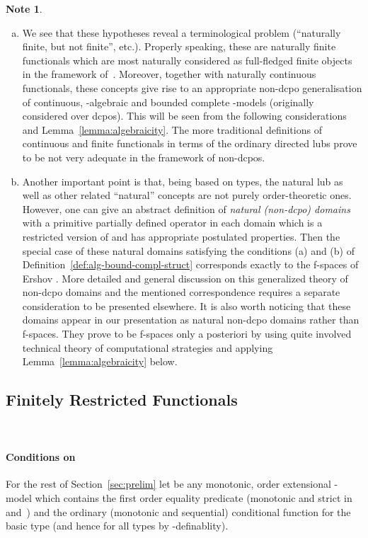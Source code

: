\documentclass[fleqn]{LMCS}
\theoremstyle{plain}\newtheorem{satz}[thm]{Satz}
\theoremstyle{plain}\newtheorem{hyp}[thm]{Hypothesis}
\theoremstyle{plain}\newtheorem{hyps}[thm]{Hypotheses}
\theoremstyle{definition}\newtheorem{note}[thm]{Note}
\newcommand{\fo}{f}
\newcommand{\pointwiselub}{\biguplus}
\newcommand{\fla}[1]{}
\newcommand{\?}{\mbox{?}}
\begin{document}
\begin{note}\hfill
\begin{enumerate}[(a)]
\item We see that these hypotheses reveal a terminological problem 
(``naturally finite, but not finite'', etc.). Properly speaking, 
these are naturally finite functionals which are most naturally 
considered as full-fledged finite objects in the framework of~. 
Moreover, together with naturally continuous functionals, these concepts 
give rise to an appropriate non-dcpo generalisation 
of continuous, -algebraic and bounded complete -models 
(originally considered over dcpos). 
This will be seen from the following considerations and 
Lemma~\ref{lemma:algebraicity}. 
The more traditional definitions of continuous and finite functionals in terms 
of the ordinary directed lubs prove to be not very adequate 
in the framework of non-dcpos. 

\item Another important point is that, being based on types, the natural lub 
\fla{\pointwiselub} as well as other related ``natural'' 
concepts are not purely order-theoretic ones. 
However, 
one can give an abstract definition of \emph{natural (non-dcpo) domains} 
with a primitive partially defined operator 
 in each domain which is 
a restricted version of  and has appropriate postulated properties. 
Then the special case of these natural domains satisfying 
the conditions (a) and (b) of Definition~\ref{def:alg-bound-compl-struct} 
corresponds exactly to the \fo-spaces of Ershov \cite{Ershov72}. 
More detailed and general discussion on this generalized theory 
of non-dcpo domains and the mentioned correspondence requires 
a separate consideration to be presented elsewhere. 
It is also worth noticing that these domains appear in our presentation as 
natural non-dcpo domains rather than \fo-spaces. They prove to be 
\fo-spaces only a posteriori by using quite involved technical theory 
of computational strategies and applying Lemma~\ref{lemma:algebraicity} below.
\end{enumerate}
\end{note}

\subsection{Finitely Restricted Functionals} \ \ 


\paragraph*{\bf Conditions on } 
For the rest of Section~\ref{sec:prelim} 
let  be any monotonic, order extensional 
-model which contains the first order 
equality predicate  
(monotonic and strict in  and~) 
and the ordinary (monotonic and sequential) 
conditional function  
for the basic type (and hence for all types by -definablity). 
\end{document}
